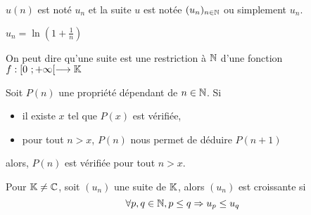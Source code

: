 \notation{}
$u(n)$ est noté $u_n$ et la suite $u$ est notée $(u_n)_{n\in \mathbb{N}}$ ou simplement $u_n$.

\exemple{}
$u_n = \ln\left(1+\frac{1}{n}\right)$

\remarque{}
On peut dire qu'une suite est une restriction à $\mathbb{N}$ d'une fonction $f:[0~;+\infty[\longrightarrow\mathbb{K}$

Soit $P(n)$ une propriété dépendant de $n\in \mathbb{N}$. Si
\begin{itemize}
	\item il existe $x$ tel que $P(x)$ est vérifiée,
	\item pour tout $n>x$, $P(n)$ nous permet de déduire $P(n+1)$
\end{itemize}
alors, $P(n)$ est vérifiée pour tout $n>x$.

\prop{}

\demonstration{}

Pour $\mathbb{K} \neq\mathbb{C}$, soit $(u_n)$ une suite de $\mathbb{K}$, alors $(u_n)$ est croissante si 
$$\forall p,q \in \mathbb{N}, p \leq q \Rightarrow u_p \leq u_q$$